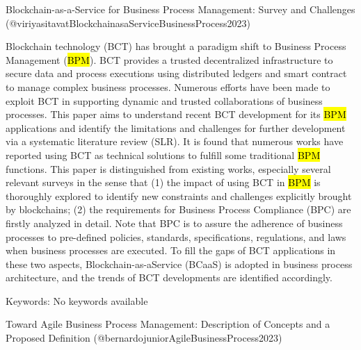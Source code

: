 \documentclass[
  letterpaper,
  DIV=11,
  numbers=noendperiod]{scrartcl}
\author{}
\date{}
\begin{document}
Blockchain-as-a-Service for Business Process Management: Survey and
Challenges (@viriyasitavatBlockchainasaServiceBusinessProcess2023)

Blockchain technology (BCT) has brought a paradigm shift to Business
Process Management (\hl{BPM}). BCT provides a trusted decentralized
infrastructure to secure data and process executions using distributed
ledgers and smart contract to manage complex business processes.
Numerous efforts have been made to exploit BCT in supporting dynamic and
trusted collaborations of business processes. This paper aims to
understand recent BCT development for its \hl{BPM} applications and
identify the limitations and challenges for further development via a
systematic literature review (SLR). It is found that numerous works have
reported using BCT as technical solutions to fulfill some traditional
\hl{BPM} functions. This paper is distinguished from existing works,
especially several relevant surveys in the sense that (1) the impact of
using BCT in \hl{BPM} is thoroughly explored to identify new constraints
and challenges explicitly brought by blockchains; (2) the requirements
for Business Process Compliance (BPC) are firstly analyzed in detail.
Note that BPC is to assure the adherence of business processes to
pre-defined policies, standards, specifications, regulations, and laws
when business processes are executed. To fill the gaps of BCT
applications in these two aspects, Blockchain-as-aService (BCaaS) is
adopted in business process architecture, and the trends of BCT
developments are identified accordingly.

Keywords: No keywords available

Toward Agile Business Process Management: Description of Concepts and a
Proposed Definition (@bernardojuniorAgileBusinessProcess2023)
\end{document}
